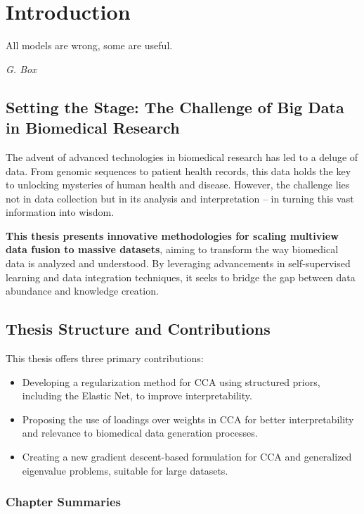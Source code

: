 \graphicspath{{chapters/introduction/}}
\chapter{Introduction}\label{chap:introduction}

\epigraph{All models are wrong, some are useful.}{\textit{G. Box}}

\section{Setting the Stage: The Challenge of Big Data in Biomedical Research}

The advent of advanced technologies in biomedical research has led to a deluge of data.
From genomic sequences to patient health records, this data holds the key to unlocking mysteries of human health and disease.
However, the challenge lies not in data collection but in its analysis and interpretation – in turning this vast information into wisdom.

\textbf{This thesis presents innovative methodologies for scaling multiview data fusion to massive datasets}, aiming to transform the way biomedical data is analyzed and understood.
By leveraging advancements in self-supervised learning and data integration techniques, it seeks to bridge the gap between data abundance and knowledge creation.

\section{Thesis Structure and Contributions}

This thesis offers three primary contributions:

\begin{itemize}
    \item Developing a regularization method for CCA using structured priors, including the Elastic Net, to improve interpretability.
    \item Proposing the use of loadings over weights in CCA for better interpretability and relevance to biomedical data generation processes.
    \item Creating a new gradient descent-based formulation for CCA and generalized eigenvalue problems, suitable for large datasets.
\end{itemize}

\subsection{Chapter Summaries}

